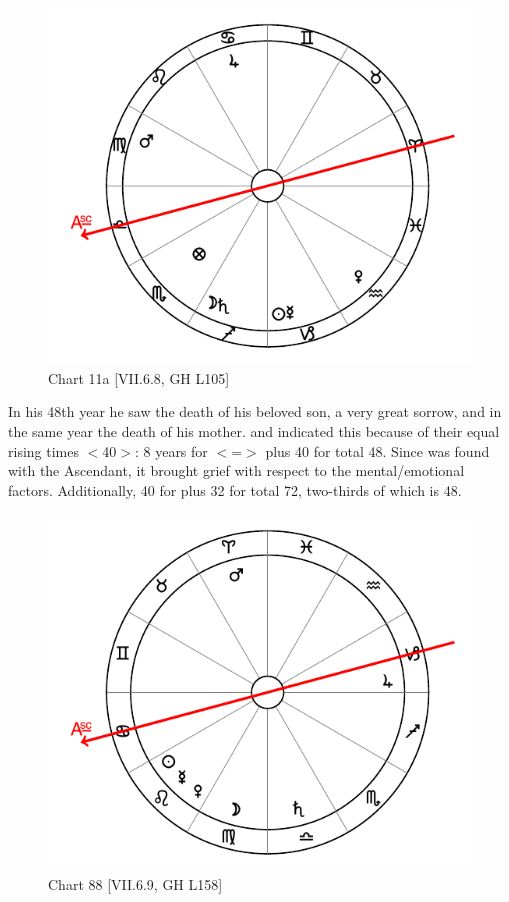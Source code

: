 \begin{figure}
\centering
\vspace{0pt}
\includegraphics[width=.68\textwidth]{charts/2_21_11}
\caption{Chart 11a [VII.6.8, GH L105] }
\label{fig:chart11a}
\end{figure} 

In his 48th year he saw the death of his beloved son, a very great sorrow, and in the same year the death of his mother. \Virgo\xspace and \Libra\xspace indicated this because of their equal rising times $<$40$>$: 8 years for \Libra\xspace $<$=\Venus$>$ plus 40 for \Virgo\xspace total 48. Since \Mars\xspace was found with the Ascendant, it brought grief with respect to the mental/emotional factors. Additionally, 40 for \Virgo\xspace plus 32 for \Sagittarius\xspace total 72, two-thirds of which is 48.

\newpage

\begin{figure}
\centering
\vspace{0pt}
\includegraphics[width=.68\textwidth]{charts/7_6_09}
\caption{Chart 88 [VII.6.9, GH L158] }
\label{fig:chart88}
\end{figure} 

